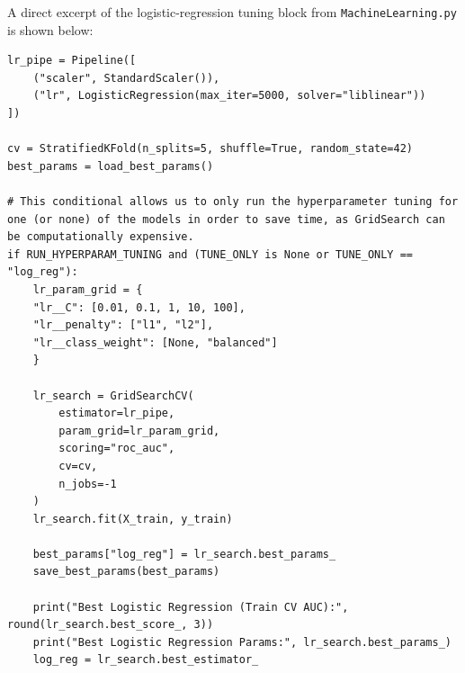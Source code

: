 \documentclass[11pt]{amsart}
\theoremstyle{definition}                  %
\theoremstyle{remark}                       %
\numberwithin{equation}{section}
\begin{document}
A direct excerpt of the logistic-regression tuning block from \texttt{MachineLearning.py} is shown below:
\begin{lstlisting}
lr_pipe = Pipeline([
    ("scaler", StandardScaler()),
    ("lr", LogisticRegression(max_iter=5000, solver="liblinear"))
])

cv = StratifiedKFold(n_splits=5, shuffle=True, random_state=42)
best_params = load_best_params()

# This conditional allows us to only run the hyperparameter tuning for one (or none) of the models in order to save time, as GridSearch can be computationally expensive.
if RUN_HYPERPARAM_TUNING and (TUNE_ONLY is None or TUNE_ONLY == "log_reg"):
    lr_param_grid = {
    "lr__C": [0.01, 0.1, 1, 10, 100],
    "lr__penalty": ["l1", "l2"],
    "lr__class_weight": [None, "balanced"]
    }

    lr_search = GridSearchCV(
        estimator=lr_pipe,
        param_grid=lr_param_grid,
        scoring="roc_auc",
        cv=cv,
        n_jobs=-1
    )
    lr_search.fit(X_train, y_train)

    best_params["log_reg"] = lr_search.best_params_
    save_best_params(best_params)

    print("Best Logistic Regression (Train CV AUC):", round(lr_search.best_score_, 3))
    print("Best Logistic Regression Params:", lr_search.best_params_)
    log_reg = lr_search.best_estimator_
\end{lstlisting}
\end{document}
